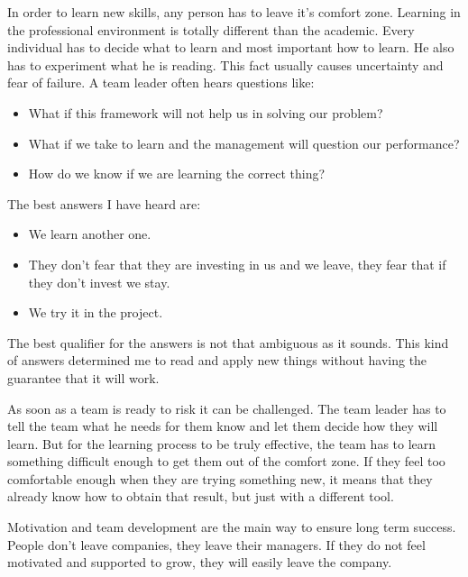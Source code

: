 In order to learn new skills, any person has to leave it's comfort zone. Learning in the professional environment is totally different than the academic. Every individual has to decide what to learn and most important how to learn. He also has to experiment what he is reading. This fact usually causes uncertainty and fear of failure. A team leader often hears questions like:

\begin{itemize}
\item What if this framework will not help us in solving our problem?
\item What if we take to learn and the management will question our performance?
\item How do we know if we are learning the correct thing?
\end{itemize}

The best answers I have heard are:
\begin{itemize}
\item We learn another one.
\item They don't fear that they are investing in us and we leave, they fear that if they don't invest we stay.
\item We try it in the project.
\end{itemize}

The best qualifier for the answers is not that ambiguous as it sounds. This kind of answers determined me to read and apply new things without having the guarantee that it will work. 

As soon as a team is ready to risk it can be challenged. The team leader has to tell the team what he needs for them know and let them decide how they will learn. But for the learning process to be truly effective, the team has to learn something difficult enough to get them out of the comfort zone. If they feel too comfortable enough when they are trying something new, it means that they already know how to obtain that result, but just with a different tool. 

Motivation and team development are the main way to ensure long term success. People don't leave companies, they leave their managers. If they do not feel motivated and supported to grow, they will easily leave the company.